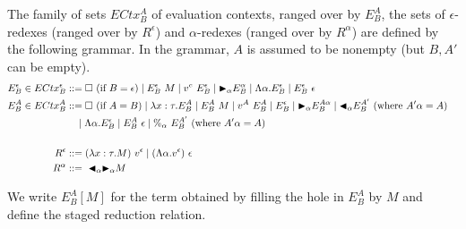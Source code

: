 \begin{definition}
  The family of sets $ECtx^A_B$ of evaluation contexts, ranged over by $E^A_B$,
the sets of $\epsilon$-redexes (ranged over by $R^\epsilon$) and $\alpha$-redexes (ranged over by $R^\alpha$) are defined by the following grammar.
	In the grammar, $A$ is assumed to be nonempty (but $B,A'$ can be empty).
	\begin{align*}
		E^\epsilon_B \in ECtx^\epsilon_B & ::= \square\ (\text{if\ } B = \epsilon) \mid E^\epsilon_B\ M \mid v^e\ E^\epsilon_B     
		\mid {\mathop{\blacktriangleright}}_\alpha E^\alpha_B \mid \Lambda\alpha.E^\epsilon_B
		\mid E^\epsilon_B\ \epsilon                                                                                                 \\
		E^A_B \in ECtx^A_B               & ::= \square\ (\text{if } A = B) \mid \lambda x:\tau.E^A_B \mid E^A_B\ M \mid v^A\ E^A_B 
		\mid E^\epsilon_B \mid {\mathop{\blacktriangleright}}_\alpha E^{A\alpha}_B
		\mid {\mathop{\blacktriangleleft}}_\alpha E^{A'}_B \ (\text{where } A'\alpha = A)                                                                    \\
		                                 & \quad \mid \Lambda\alpha.E^\epsilon_B                                                   
		\mid E^A_B\ \epsilon \mid \%_\alpha\ E^{A'}_B \ (\text{where } A'\alpha = A)                                                \\
\\
		 R^\epsilon  & ::= (\lambda x:\tau.M)\ v^\epsilon \mid (\Lambda\alpha.v^\epsilon)\ \epsilon                                       & \\
		 R^\alpha    & ::=\ {\mathop{\blacktriangleleft}}_\alpha {\mathop{\blacktriangleright}}_\alpha M                                                                                      & \\	\end{align*}
\end{definition}


We write $E^A_B[M]$ for the term obtained by filling the hole in $E^A_B$ by $M$
and define the staged reduction relation.

